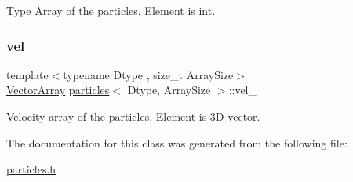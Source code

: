 Type Array of the particles. Element is int. 

\mbox{\label{classparticles_ace6c8d7c95916863c7d03c3a6c51f5bb}} 
\subsubsection{\texorpdfstring{vel\+\_\+}{vel\_}}
{\footnotesize\ttfamily template$<$typename Dtype , size\+\_\+t Array\+Size$>$ \\
\mbox{\hyperlink{classparticles_ac5dddc8c666e4f7057b5109f95926363}{Vector\+Array}} \mbox{\hyperlink{classparticles}{particles}}$<$ Dtype, Array\+Size $>$\+::vel\+\_\+\hspace{0.3cm}{\ttfamily [protected]}}



Velocity array of the particles. Element is 3D vector. 



The documentation for this class was generated from the following file\+:\begin{DoxyCompactItemize}
\item 
\mbox{\hyperlink{particles_8h}{particles.\+h}}\end{DoxyCompactItemize}
